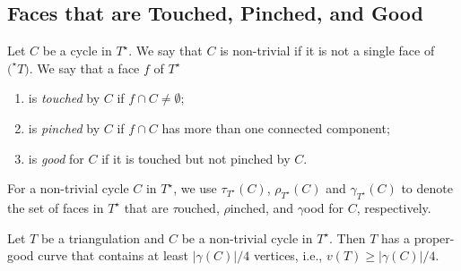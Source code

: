 \documentclass{patmorin}
\newcommand{\dual}[1]{{#1}^\star}
\begin{document}
\subsection{Faces that are Touched, Pinched, and Good}

Let $C$ be a cycle in $\dual{T}$.  We say that $C$ is non-trivial if it
is not a single face of $\dual(T)$.   We say that a face $f$ of $\dual{T}$ 
\begin{enumerate}
  \item is \emph{touched} by $C$ if $f\cap C\neq \emptyset$;
  \item is \emph{pinched} by $C$ if $f\cap C$ has more than one connected component;
  \item is \emph{good} for $C$ if it is touched but not pinched by $C$.
\end{enumerate}

For a non-trivial cycle $C$ in $\dual{T}$, we use $\tau_{\dual{T}}(C)$,
$\rho_{\dual{T}}(C)$ and $\gamma_{\dual{T}}(C)$ to denote the set of
faces in $\dual{T}$ that are $\tau$ouched, $\rho$inched, and $\gamma$ood
for $C$, respectively.

\begin{lem}
   Let $T$ be a triangulation and $C$ be a non-trivial cycle in
   $\dual{T}$.  Then $T$ has a proper-good curve that contains at least
   $|\gamma(C)|/4$ vertices, i.e., $v(T)\ge |\gamma(C)|/4$.
\end{lem}
\end{document}
